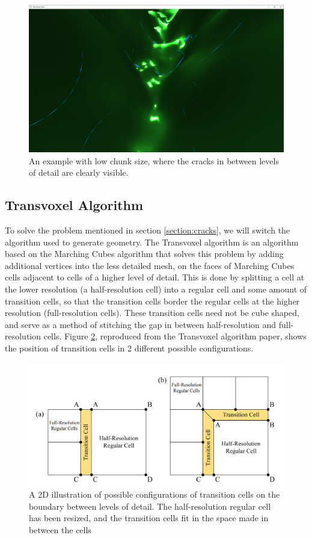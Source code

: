 \documentclass{article}
\begin{document}
\begin{figure}[H]
  \includegraphics[width=\textwidth]{cracks2.png}
  \caption{An example with low chunk size, where the cracks in between levels of detail are clearly visible.}
  \label{fig:cracks2}
\end{figure}



\subsection{Transvoxel Algorithm}
To solve the problem mentioned in section \ref{section:cracks}, we will switch the algorithm used to generate geometry. The Transvoxel algorithm \cite{lengyel_2010} is an algorithm based on the Marching Cubes algorithm that solves this problem by adding additional vertices into the less detailed mesh, on the faces of Marching Cubes cells adjacent to cells of a higher level of detail. This is done by splitting a cell at the lower resolution (a half-resolution cell) into a regular cell and some amount of transition cells, so that the transition cells border the regular cells at the higher resolution (full-resolution cells). These transition cells need not be cube shaped, and serve as a method of stitching the gap in between half-resolution and full-resolution cells. Figure \ref{fig:transition_cells}, reproduced from the Transvoxel algorithm paper, shows the position of transition cells in 2 different possible configurations.
\begin{figure}[H]
  \includegraphics[width=\textwidth]{transition_cells}
  \caption{A 2D illustration of possible configurations of transition cells on the boundary between levels of detail. The half-resolution regular cell has been resized, and the transition cells fit in the space made in between the cells}
  \label{fig:transition_cells}
\end{figure}
\end{document}
